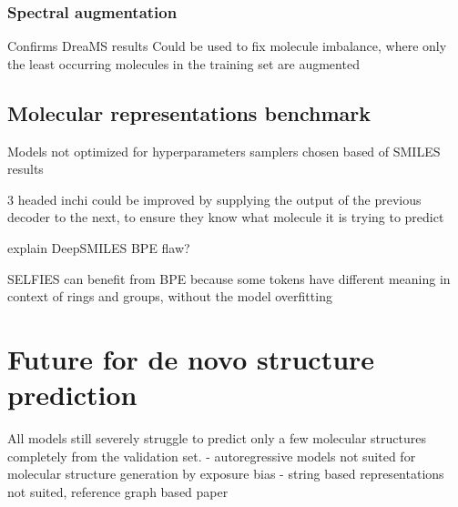 \subsubsection*{Spectral augmentation}

Confirms DreaMS results
Could be used to fix molecule imbalance, where only the least occurring molecules in the training set are augmented


\subsection{Molecular representations benchmark}

Models not optimized for hyperparameters
samplers chosen based of SMILES results

3 headed inchi could be improved by supplying the output of the previous decoder to the next, to ensure they know what molecule it is trying to predict

explain DeepSMILES BPE flaw?

SELFIES can benefit from BPE because some tokens have different meaning in context of rings and groups, without the model overfitting

\section{Future for de novo structure prediction}

All models still severely struggle to predict only a few molecular structures completely from the validation set.
- autoregressive models not suited for molecular structure generation by exposure bias
- string based representations not suited, reference graph based paper
